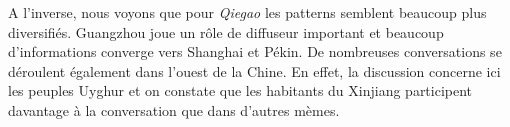A l{\textquoteright}inverse, nous voyons que pour \textit{Qiegao} les
patterns semblent beaucoup plus diversifi\'es. Guangzhou joue un r\^ole
de diffuseur important et beaucoup d{\textquoteright}informations
converge vers Shanghai et P\'ekin. De nombreuses conversations se
d\'eroulent \'egalement dans l{\textquoteright}ouest de la Chine. En
effet, la discussion concerne ici les peuples Uyghur et on constate que
les habitants du Xinjiang participent davantage \`a la conversation que
dans d{\textquoteright}autres m\`emes. 

\begin{figure}
    \centering
\end{figure}
